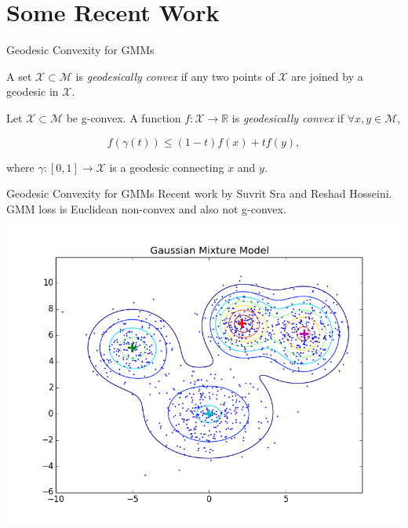 \documentclass[xcolor=dvipsnames,t]{beamer} %
\newcommand{\reals}{\mathbb{R}}
\begin{document}


\section{Some Recent Work}
\begin{frame}{Geodesic Convexity for GMMs}
   \begin{definition}
      A set $\mathcal{X}\subset \mathcal{M}$ is \emph{geodesically convex} if any two points of $\mathcal{X}$ are joined by a geodesic in $\mathcal{X}$.
   \end{definition}
   \begin{definition}
      Let $\mathcal{X}\subset \mathcal{M}$ be g-convex.  A function $f:\mathcal{X}\to\reals$ is \emph{geodesically convex} if $\forall x,y\in\mathcal{M}$,

      \[ f(\gamma(t)) \le (1-t) f(x) + tf(y), \] 

      \noindent where $\gamma:[0,1]\to\mathcal{X}$ is a geodesic connecting $x$ and $y$.
   \end{definition}

\end{frame}

\begin{frame}{Geodesic Convexity for GMMs}
   Recent work by Suvrit Sra and Reshad Hosseini.\\

   GMM loss is Euclidean non-convex and also not g-convex.

   \begin{center}
      \includegraphics[width=.8\textwidth]{figures/gmm.png}
   \end{center}
\end{frame}
\end{document}
